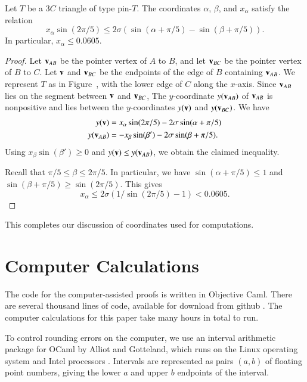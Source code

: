 \begin{lemma}
  Let $T$ be a $3C$ triangle of type pin-$T$.  The coordinates
  $\alpha$, $\beta$, and $x_\alpha$ satisfy the relation
\[
x_\alpha \sin(2\pi/5) \le 2\sigma (\sin(\alpha+\pi/5) - \sin(\beta+\pi/5)).
\]
In particular, $x_\alpha \le 0.0605$.
\end{lemma}

\begin{proof} Let ${\mathbf v}_{AB}$ be the pointer vertex of $A$ to $B$, and
  let ${\mathbf v}_{BC}$ be the pointer vertex of $B$ to $C$.  Let ${\mathbf v}$ and
  ${\mathbf v}_{BC}$ be the endpoints of the edge of $B$ containing ${\mathbf v}_{AB}$.
  We represent $T$ as in Figure~, with the lower edge of
  $C$ along the $x$-axis.  Since ${\mathbf v}_{AB}$ lies on the segment between
  ${\mathbf v}$ and ${\mathbf v}_{BC}$, The $y$-coordinate $y({\mathbf v}_{AB})$ of ${\mathbf v}_{AB}$ is
  nonpositive and lies between the $y$-coordinates $y({\mathbf v})$ and
  $y({\mathbf v}_{BC})$.  We have
\begin{align*}
y({\mathbf v}) &= x_\alpha \sin(2\pi/5) - 2\sigma\sin(\alpha+\pi/5)\\
y({\mathbf v}_{AB}) & = -x_\beta \sin(\beta') - 2\sigma\sin(\beta+\pi/5).
\end{align*}
Using $x_\beta \sin(\beta')\ge 0$ and $y({\mathbf v}) \le y({\mathbf v}_{AB})$, we
obtain the claimed inequality.

Recall that $\pi/5\le \beta \le 2\pi/5$.  In particular, we have
$\sin(\alpha+\pi/5) \le 1$ and $\sin(\beta+\pi/5)\ge \sin(2\pi/5)$.
This gives
\[
x_\alpha \le 2\sigma(1/\sin(2\pi/5) - 1) < 0.0605.
\]
\end{proof}


This completes our discussion of coordinates used for computations.

\section{Computer Calculations}

  The code for the computer-assisted proofs is written in Objective
  Caml.  There are several thousand lines of code, available for
  download from github \cite{Git}.  The computer calculations for this
  paper take many hours in total to run.  

To control
  rounding errors on the computer, we use an interval arithmetic
  package for OCaml by Alliot and Gotteland, which runs on the Linux
  operating system and Intel processors \cite{All}.  Intervals are represented as 
  pairs $(a,b)$ of floating point numbers, giving the lower $a$ and upper $b$ endpoints
of the interval. 



